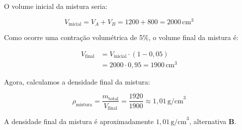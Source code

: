 \documentclass[a4paper,12pt]{article}
\begin{document}
\begin{flushleft}
\noindent
O volume inicial da mistura seria:

\[
V_{\text{inicial}} = V_A + V_B = 1200 + 800 = 2000\,\text{cm}^3
\]

\noindent
Como ocorre uma contração volumétrica de 5\%, o volume final da mistura é:

\begin{align*}
V_{\text{final}} &= V_{\text{inicial}} \cdot (1 - 0{,}05) \\
&= 2000 \cdot 0{,}95 = 1900\,\text{cm}^3
\end{align*}

\noindent
Agora, calculamos a densidade final da mistura:

\[
\rho_{\text{mistura}} = \frac{m_{\text{total}}}{V_{\text{final}}} = \frac{1920}{1900} \approx 1{,}01\,\text{g/cm}^3
\]

\noindent
A densidade final da mistura é aproximadamente \( \boxed{1{,}01\,\text{g/cm}^3} \), alternativa \colorbox{green!50}{\textbf{B}}.

\end{flushleft}
\end{document}
